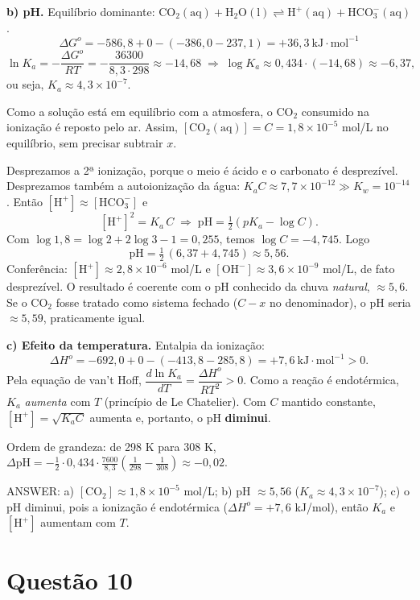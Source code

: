\documentclass{article}%
\begin{document}
\textbf{b) pH.}
Equilíbrio dominante: $\mathrm{CO_2(aq)+H_2O(l)\rightleftharpoons H^+(aq)+HCO_3^-(aq)}$.
\[
\Delta G^o=-586{,}8+0-(-386{,}0-237{,}1)=+36{,}3\ \text{kJ}\cdot\text{mol}^{-1}
\]
\[
\ln K_a=-\frac{\Delta G^o}{RT}=-\frac{36300}{8{,}3\cdot298}\approx-14{,}68
\;\Rightarrow\;
\log K_a\approx0{,}434\cdot(-14{,}68)\approx-6{,}37,
\]
ou seja, $K_a\approx4{,}3\times10^{-7}$.

Como a solução está em equilíbrio com a atmosfera, o CO$_2$ consumido na ionização é reposto pelo ar. Assim, $[\mathrm{CO_2(aq)}]=C=1{,}8\times10^{-5}$ mol/L no equilíbrio, sem precisar subtrair $x$.

Desprezamos a 2ª ionização, porque o meio é ácido e o carbonato é desprezível. Desprezamos também a autoionização da água: $K_aC\approx7{,}7\times10^{-12}\gg K_w=10^{-14}$. Então $[\mathrm{H^+}]\approx[\mathrm{HCO_3^-}]$ e
\[
[\mathrm{H^+}]^2=K_a\,C\;\Rightarrow\;\mathrm{pH}=\tfrac12\left(pK_a-\log C\right).
\]
Com $\log 1{,}8=\log2+2\log3-1=0{,}255$, temos $\log C=-4{,}745$. Logo
\[
\mathrm{pH}=\tfrac12\,(6{,}37+4{,}745)\approx 5{,}56 .
\]
Conferência: $[\mathrm{H^+}]\approx2{,}8\times10^{-6}$ mol/L e $[\mathrm{OH^-}]\approx3{,}6\times10^{-9}$ mol/L, de fato desprezível. O resultado é coerente com o pH conhecido da chuva \emph{natural}, $\approx5{,}6$. Se o CO$_2$ fosse tratado como sistema fechado ($C-x$ no denominador), o pH seria $\approx5{,}59$, praticamente igual.

\textbf{c) Efeito da temperatura.}
Entalpia da ionização:
\[
\Delta H^o=-692{,}0+0-(-413{,}8-285{,}8)=+7{,}6\ \text{kJ}\cdot\text{mol}^{-1}>0 .
\]
Pela equação de van't Hoff, $\dfrac{d\ln K_a}{dT}=\dfrac{\Delta H^o}{RT^2}>0$. Como a reação é endotérmica, $K_a$ \emph{aumenta} com $T$ (princípio de Le Chatelier). Com $C$ mantido constante, $[\mathrm{H^+}]=\sqrt{K_aC}$ aumenta e, portanto, o pH \textbf{diminui}.

Ordem de grandeza: de 298 K para 308 K, $\Delta\mathrm{pH}=-\tfrac12\cdot0{,}434\cdot\frac{7600}{8{,}3}\left(\frac1{298}-\frac1{308}\right)\approx-0{,}02$.

ANSWER: a) $[\mathrm{CO_2}]\approx1{,}8\times10^{-5}$ mol/L; b) pH $\approx5{,}56$ ($K_a\approx4{,}3\times10^{-7}$); c) o pH diminui, pois a ionização é endotérmica ($\Delta H^o=+7{,}6$ kJ/mol), então $K_a$ e $[\mathrm{H^+}]$ aumentam com $T$.%
\newpage%
\section*{Questão 10}
\end{document}
